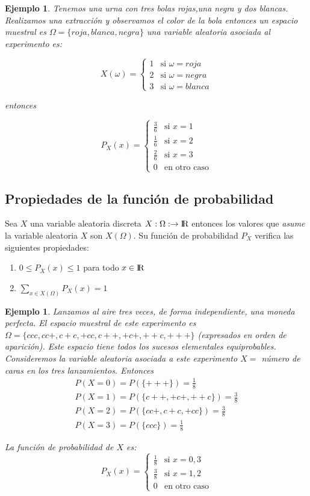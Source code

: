 \documentclass[12pt]{report}
\newtheorem{example}[definition]{Ejemplo}
\newcommand{\va}{variable aleatoria }
\begin{document}
\begin{example} Tenemos una urna con tres bolas rojas,una negra y dos blancas.
Realizamos una extracción y observamos el color de la bola entonces un espacio muestral es
$\Omega=\{roja, blanca, negra\}$ una variable aleatoria asociada al experimento es:

 $$X(\omega)=\left\{\begin{array}{ll} 1 & \mbox{si } \omega=roja  \\
2 & \mbox{si }\omega=negra \\ 3 & \mbox{si } \omega=blanca \end{array}\right.$$

entonces

$$P_{X}(x)=\left\{\begin{array}{ll} \frac{3}{6} & \mbox{si } x=1\\
\frac{1}{6} & \mbox{si } x=2\\ \frac{2}{6} & \mbox{si } x=3\\ 0 & \mbox{en otro
caso}\end{array}\right.$$

\end{example}

\subsection{Propiedades de la función de probabilidad}
 Sea $X$ una \va discreta $X:\Omega:\to\mbox{I\kern-.2em\hbox{R}}$ entonces los valores  que
  \emph{asume}  la \va $X$ son
$X(\Omega)$. Su función de probabilidad $P_{X}$ verifica las siguientes propiedades:
\begin{enumerate}[1)]
\item $0\leq P_{X}(x)\leq 1$ para todo $x\in\mbox{I\kern-.2em\hbox{R}}$
\item $\sum\limits_{x\in X(\Omega)} P_{X}(x)=1$
\end{enumerate}


\begin{example}
    Lanzamos al aire tres veces, de forma independiente, una
    moneda perfecta. El espacio muestral de este experimento es
    $\Omega=\{ccc,cc+,c+c,+cc,c++,+c+,++c,+++\}$ (expresados en orden
    de aparición). Este espacio tiene todos los sucesos elementales
    equiprobables. Consideremos la variable aleatoria asociada a este
    experimento $X=$ número de caras en los tres lanzamientos. Entonces
    $$\begin{array}{l}
P(X=0)=P(\{+++\})=\frac{1}{8}\\ P(X=1)=P(\{c++,+c+,++c\})=\frac{3}{8}\\
    P(X=2)=P(\{cc+,c+c,+cc\})=\frac{3}{8}\\
    P(X=3)=P(\{ccc\})=\frac{1}{8}
    \end{array}$$

    La función de probabilidad de $X$ es:
    $$P_{X}(x)=\left\{\begin{array}{ll} \frac{1}{8} & \mbox{si } x=0,3\\
\frac{3}{8} & \mbox{si } x=1,2\\ 0 & \mbox{en otro caso}\end{array}\right.$$
\end{example}
\end{document}
